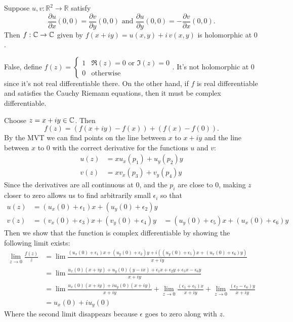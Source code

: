 \documentclass{homework}
\begin{document}
\begin{problem}\label{cauchy-riemann-alone-not-sufficient}Suppose $u, v : \mathbb{R}^2 \to \mathbb{R}$ satisfy
  \[
    \frac{\partial u}{\partial x}(0,0)=\frac{\partial v}{\partial y}(0,0)
    \mbox{ and }
    \frac{\partial u}{\partial y}(0,0)=-\frac{\partial v}{\partial x}(0,0).
  \]
  Then $f : \mathbb{C} \to \mathbb{C}$ given by $f(x+iy) = u(x,y) + i \, v(x,y)$ is holomorphic at $0$.
\end{problem}
\begin{solution}
False, define $f(z) = \begin{cases}1&\Re(z) = 0 \text{ or } \Im(z) = 0\\ 0 & \text{otherwise}\end{cases}$. It's not holomorphic at 0 since it's not real differentiable there. On the other hand, if $f$ is real differentiable and satisfies the Cauchy Riemann equations, then it must be complex differentiable.

Choose $z = x + iy\in\mathbb{C}$. Then \[f(z) = (f(x + iy) - f(x)) +  (f(x) - f(0)).\] By the MVT we can find points on the line between $x$ to $x+iy$ and the line between $x$ to $0$ with the correct derivative for the functions $u$ and $v$:
\begin{align*}
u(z) &= xu_x(p_1) + u_y(p_2)y\\
v(z) &= xv_x(p_3) +v_y(p_4)y
\end{align*}
Since the derivatives are all continuous at 0, and the $p_i$ are close to 0, making $z$ closer to zero allows us to find arbitrarily small $\epsilon_i$ so that 
\begin{align*}
u(z) &= (u_x(0)+\epsilon_1)x + (u_y(0)+\epsilon_2)y \\
v(z) &= (v_x(0)+\epsilon_3)x + (v_y(0)+\epsilon_4)y &= (u_y(0)+\epsilon_5)x + (u_x(0)+\epsilon_6)y
\end{align*}
Then we show that the function is complex differentiable by showing the following limit exists:
\begin{align*}
\lim_{z\to 0} \frac{f(z)}{z} &= \lim \frac{(u_x(0)+\epsilon_1)x + (u_y(0)+\epsilon_2)y + i((u_y(0)+\epsilon_5)x + (u_x(0)+\epsilon_6)y)}{x+ iy}\\
&= \lim \frac{u_x(0)(x+iy) + u_y(0)(y-ix) + \epsilon_1x + \epsilon_2y + \epsilon_5x - \epsilon_6y}{x+ iy}\\
&= \lim \frac{u_x(0)(x+iy) + iu_y(0)(x+iy)}{x+iy} + \lim_{z\to 0} \frac{(\epsilon_1+\epsilon_5)x}{x+iy} + \lim_{z\to 0}\frac{(\epsilon_2 - \epsilon_6)y}{x+ iy}\\
&= u_x(0) + iu_y(0)
\end{align*}
Where the second limit disappears because $\epsilon$ goes to zero along with $z$.
\end{solution}
\end{document}
